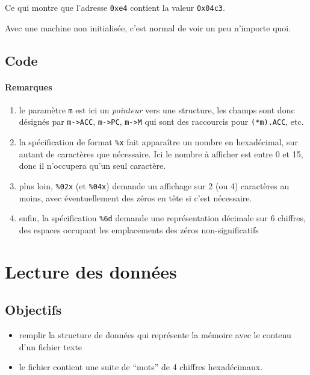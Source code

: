 \documentclass[10pt]{article}
\begin{document}
Ce qui montre que l'adresse \texttt{0xe4} contient la valeur \texttt{0x04c3}.

Avec une machine non initialisée, c'est normal de voir un
peu n'importe quoi.


\subsection{Code}



\paragraph{Remarques}
\begin{enumerate}
\item le paramètre \texttt{m} est ici un \emph{pointeur} vers une
  structure, les champs sont donc désignés par \verb/m->ACC/,
  \verb/m->PC/, \verb/m->M/ qui sont des raccourcis pour 
\verb/(*m).ACC/, etc.

\item la spécification de format \texttt{\%x} fait apparaître un
  nombre en hexadécimal, sur autant de caractères que nécessaire. Ici
  le nombre à afficher est entre 0 et 15, donc il n'occupera qu'un
  seul caractère.

\item plus loin, \texttt{\%02x}  (et \texttt{\%04x}) demande un affichage sur 2 (ou 4) caractères au moins,
avec éventuellement des zéros en tête si c'est nécessaire. 
\item enfin, la spécification \texttt{\%6d} demande une représentation
  décimale sur 6 chiffres, des espaces occupant les emplacements des
  zéros non-significatifs
\end{enumerate}

\section{Lecture des données}

\subsection{Objectifs}
\begin{itemize}
\item remplir la structure de données qui représente la mémoire avec 
le contenu d'un fichier texte
\item le fichier contient une suite de ``mots'' de 4 chiffres hexadécimaux.
\end{itemize}
\end{document}
